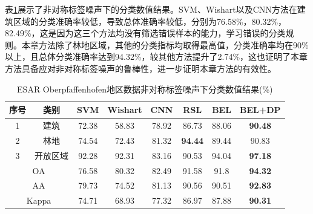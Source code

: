 表\ref{tab:ober_res_random}展示了非对称标签噪声下的分类数值结果。SVM、Wishart以及CNN方法在建筑区域的分类准确率较低，导致总体准确率较低，分别为76.58\%，80.32\%，82.49\%，这是因为这三个方法均没有筛选错误样本的能力，学习错误的分类规则。本章方法除了林地区域，其他的分类指标均取得最高值，分类准确率均在90\%以上，且总体分类准确率达到94.32\%，较其他方法提升了2.74\%，这也证明了本章方法具备应对非对称标签噪声的鲁棒性，进一步证明本章方法的有效性。
\begin{table}[ht!]
    \caption{ESAR Oberpfaffenhofen地区数据非对称标签噪声下分类数值结果(\%)}
    \label{tab:ober_res_random}
    \begin{tabular}{cccccccc}
        \toprule[1.5bp]
        序号                        & 类别    & SVM   & Wishart & CNN   & RSL            & BEL            & BEL+DP         \\
        \midrule[0.75bp]
        1                         & 建筑    & 72.38 & 58.83   & 78.92 & 86.73          & 88.06          & \textbf{90.48} \\
        2                         & 林地    & 74.54 & 72.43   & 81.32 & \textbf{94.44} & 89.44          & 90.83          \\
        3                         & 开放区域  & 92.28 & 92.31   & 83.16 & 90.53          & 94.04          & \textbf{97.18} \\
        \midrule[0.75bp]
        \multicolumn{2}{c}{OA}    & 76.58 & 80.32 & 82.49   & 91.58 & 91.8           & \textbf{94.32}                  \\
        \multicolumn{2}{c}{AA}    & 79.73 & 74.52 & 81.13   & 90.56 & 90.51          & \textbf{92.83}                  \\
        \multicolumn{2}{c}{Kappa} & 74.71 & 68.93 & 77.32   & 86.97 & 87.88          & \textbf{90.31}                  \\
        \bottomrule[0.75bp]
    \end{tabular}
\end{table}


